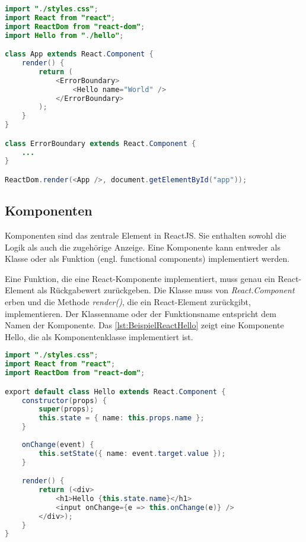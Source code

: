 \begin{lstlisting}[caption=Beispiel React-Anwendung: Aufruf der Render-Methode, label=lst:BeispielReactRender, language=Java]
import "./styles.css";
import React from "react";
import ReactDom from "react-dom";
import Hello from "./hello";

class App extends React.Component {
	render() {	
		return (
			<ErrorBoundary>
				<Hello name="World" />
			</ErrorBoundary>
		);
	}
}

class ErrorBoundary extends React.Component {
	...	
}

ReactDom.render(<App />, document.getElementById("app"));
\end{lstlisting}


\subsection{Komponenten}\label{sec:reactKomponenten}


Komponenten sind das zentrale Element in ReactJS. Sie enthalten sowohl die Logik als auch die zugehörige Anzeige. Eine Komponente kann entweder als Klasse oder als Funktion (engl. functional components) implementiert werden. 

Eine Funktion, die eine React-Komponente implementiert, muss genau ein React-Element als Rückgabewert zurückgeben. Die Klasse muss von \textit{React.Component} erben und die Methode \textit{render()}, die ein React-Element zurückgibt, implementieren. Der Klassenname oder der Funktionsname entspricht dem Namen der Komponente.\autocite[vgl.][80\psqq]{Zeigermann.2016} Das \autoref{lst:BeispielReactHello} zeigt eine Komponente Hello, die als Komponentenklasse implementiert ist. 


\begin{lstlisting}[caption=Beispiel React-Anwendung: Die Komponente Hello, label=lst:BeispielReactHello, language=Java]
import "./styles.css";
import React from "react";
import ReactDom from "react-dom";

export default class Hello extends React.Component {
	constructor(props) {
		super(props);
		this.state = { name: this.props.name };
	}
	
	onChange(event) {
		this.setState({ name: event.target.value });
	}

	render() {
		return (<div>
			<h1>Hello {this.state.name}</h1>
			<input onChange={e => this.onChange(e)} />
		</div>);
	}
}
\end{lstlisting}


